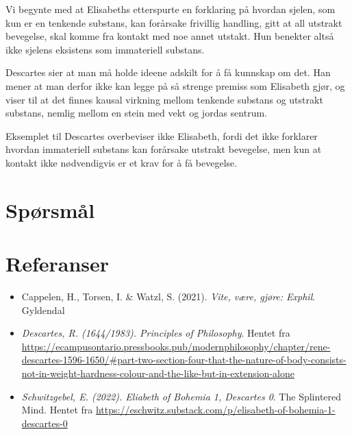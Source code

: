 \documentclass[12pt, a4paper]{article}
\begin{document}
\begin{flushleft}
    Vi begynte med at Elisabeths etterspurte en forklaring på hvordan sjelen, som kun er en tenkende substans, kan forårsake frivillig handling, gitt at all utstrakt bevegelse, skal komme fra kontakt med noe annet utstakt. Hun benekter altså ikke sjelens eksistens som immateriell substans.
\end{flushleft}

\begin{flushleft}
    Descartes sier at man må holde ideene adskilt for å få kunnskap om det. Han mener at man derfor ikke kan legge på så strenge premiss som Elisabeth gjør, og viser til at det finnes kausal virkning mellom tenkende substans og utstrakt substans, nemlig mellom en stein med vekt og jordas sentrum. 
\end{flushleft}

\begin{flushleft}
    Eksemplet til Descartes overbeviser ikke Elisabeth, fordi det ikke forklarer hvordan immateriell substans kan forårsake utstrakt bevegelse, men kun at kontakt ikke nødvendigvis er et krav for å få bevegelse.
\end{flushleft}

\section{Spørsmål}


\section{Referanser}


\begin{itemize}
    \item Cappelen, H., Torsen, I. \& Watzl, S. (2021). \textit{Vite, være, gjøre: Exphil}. Gyldendal
    \item \textit{Descartes, R. (1644/1983). Principles of Philosophy}. Hentet fra \url{https://ecampusontario.pressbooks.pub/modernphilosophy/chapter/rene-descartes-1596-1650/#part-two-section-four-that-the-nature-of-body-consists-not-in-weight-hardness-colour-and-the-like-but-in-extension-alone}
    \item \textit{Schwitzgebel, E. (2022). Eliabeth of Bohemia 1, Descartes 0}. The Splintered Mind. Hentet fra \url{https://eschwitz.substack.com/p/elisabeth-of-bohemia-1-descartes-0}
\end{itemize}
\end{document}
